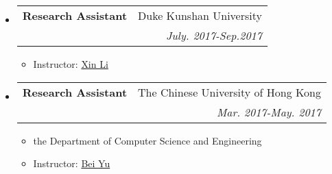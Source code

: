 \documentclass[letterpaper,11pt]{article}%
\makeatletter
\newlength{\outerbordwidth}
\newcommand{\resitem}[1]{\item #1 \vspace{-2pt}}
\newcommand{\resheading}[1]{\vspace{8pt}
  \parbox{\textwidth}{\setlength{\FrameSep}{\outerbordwidth}
    \begin{shaded}

\setlength{\fboxsep}{0pt}\framebox[\textwidth][l]{\setlength{\fboxsep}{4pt}\fcolorbox{shadecolorB}{shadecolorB}{\textbf{\sffamily{\mbox{~}\makebox[6.762in][l]{\large #1} \vphantom{p\^{E}}}}}}
    \end{shaded}
  }\vspace{-5pt}
}
\newcommand{\ressubheading}[4]{
\begin{tabular*}{6.5in}{l@{\cftdotfill{\cftsecdotsep}\extracolsep{\fill}}r}
		\textbf{#1} & #2 \\
		\textit{#3} & \textit{#4} \\
\end{tabular*}\vspace{-6pt}}
\makeatother
\begin{document}

\begin{itemize}

\item
	\ressubheading{Research Assistant}{Duke Kunshan University}{}{July. 2017-Sep.2017}
	\begin{itemize}
      \resitem{Instructor: \href{http://ece.duke.edu/faculty/xin-li}{Xin Li}}
	\end{itemize}
\end{itemize}

\begin{itemize}

\item
	\ressubheading{Research Assistant}{The Chinese University of Hong Kong}{}{Mar. 2017-May. 2017}
	\begin{itemize}
      \resitem{the Department of Computer Science and Engineering}
      \resitem{Instructor: \href{http://www.cse.cuhk.edu.hk/~byu/}{Bei Yu}}
	\end{itemize}
\end{itemize}












\end{document}
